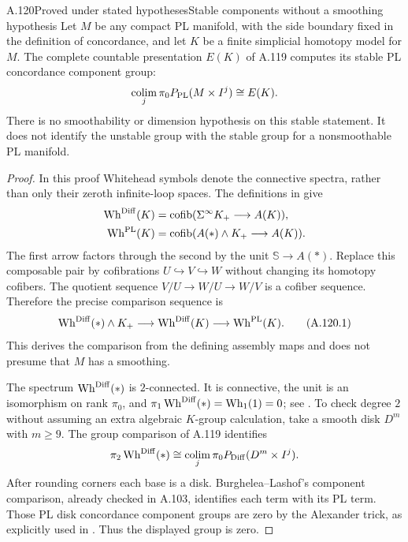 \begin{saresult}{A.120}{Proved under stated hypotheses}{Stable components without a smoothing hypothesis}
Let $M$ be any compact PL manifold, with the side boundary fixed in
the definition of concordance, and let $K$ be a finite simplicial
homotopy model for $M$. The complete countable presentation $E(K)$
of A.119 computes its stable PL concordance component group:
\[
 \operatorname*{colim}_{j}\pi_0P_{\rm PL}(M\times I^j)
       \cong E(K).
\]
There is no smoothability or dimension hypothesis on this stable
statement. It does not identify the unstable group with the stable
group for a nonsmoothable PL manifold.
\end{saresult}
\begin{proof}
In this proof Whitehead symbols denote the connective spectra,
rather than only their zeroth infinite-loop spaces. The definitions
in \cite[Definition~1.3.2 and (1.3.3), pp.~16--17;
Definition~1.3.4 and (1.3.5), p.~18]
{WaldhausenJahrenRognes2013} give
\[
\begin{split}
 \operatorname{Wh}^{\rm Diff}(K)
   &=\operatorname{cofib}(\Sigma^\infty K_+\longrightarrow A(K)),\\
 \operatorname{Wh}^{\rm PL}(K)
   &=\operatorname{cofib}(A(*)\wedge K_+\longrightarrow A(K)).
\end{split}
\]
The first arrow factors through the second by the unit
$\mathbb S\to A(*)$. Replace this composable pair by cofibrations
$U\hookrightarrow V\hookrightarrow W$ without changing its
homotopy cofibers. The quotient sequence
$V/U\to W/U\to W/V$ is a cofiber sequence. Therefore the
precise comparison sequence is
\[
 \operatorname{Wh}^{\rm Diff}(*)\wedge K_+
 \longrightarrow\operatorname{Wh}^{\rm Diff}(K)
 \longrightarrow\operatorname{Wh}^{\rm PL}(K).
                                                        \tag{A.120.1}
\]
This derives the comparison from the defining assembly maps and
does not presume that $M$ has a smoothing.

The spectrum $\operatorname{Wh}^{\rm Diff}(*)$ is $2$-connected.
It is connective, the unit is an isomorphism on rank $\pi_0$, and
$\pi_1\operatorname{Wh}^{\rm Diff}(*)=
\operatorname{Wh}_1(1)=0$; see
\cite[Theorem~0.3 and the following paragraph, p.~4]
{WaldhausenJahrenRognes2013}. To check degree $2$ without assuming
an extra algebraic $K$-group calculation, take a smooth disk $D^m$
with $m\geq9$. The group comparison of A.119 identifies
\[
 \pi_2\operatorname{Wh}^{\rm Diff}(*)
 \cong\operatorname*{colim}_{j}
           \pi_0P_{\rm Diff}(D^m\times I^j).
\]
After rounding corners each base is a disk. Burghelea--Lashof's
component comparison, already checked in A.103, identifies each
term with its PL term. Those PL disk concordance component groups
are zero by the Alexander trick, as explicitly used in
\cite[proof of Corollary~1.4.2, p.~23]
{WaldhausenJahrenRognes2013}. Thus the displayed group is zero.


\end{proof}
